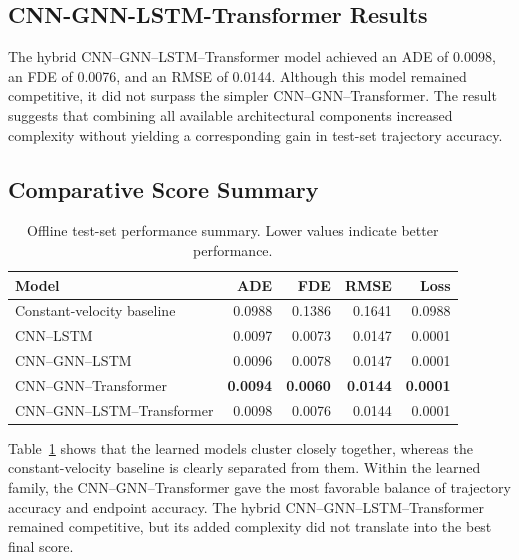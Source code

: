 \subsection{CNN-GNN-LSTM-Transformer Results}

The hybrid CNN--GNN--LSTM--Transformer model achieved an ADE of 0.0098, an FDE of 0.0076, and an RMSE of 0.0144. Although this model remained competitive, it did not surpass the simpler CNN--GNN--Transformer. The result suggests that combining all available architectural components increased complexity without yielding a corresponding gain in test-set trajectory accuracy.

\subsection{Comparative Score Summary}

\begin{table}[tbp]
    \caption{Offline test-set performance summary. Lower values indicate better performance.}
    \label{tab:offline_metric_summary}
    \centering
    \scriptsize
    \setlength{\tabcolsep}{4pt}
    \renewcommand{\arraystretch}{1.12}
    \begin{tabular}{@{}lrrrr@{}}
        \toprule
        \textbf{Model} & \textbf{ADE} & \textbf{FDE} & \textbf{RMSE} & \textbf{Loss} \\
        \midrule
        Constant-velocity baseline & 0.0988 & 0.1386 & 0.1641 & 0.0988 \\
        CNN--LSTM & 0.0097 & 0.0073 & 0.0147 & 0.0001 \\
        CNN--GNN--LSTM & 0.0096 & 0.0078 & 0.0147 & 0.0001 \\
        CNN--GNN--Transformer & \textbf{0.0094} & \textbf{0.0060} & \textbf{0.0144} & \textbf{0.0001} \\
        CNN--GNN--LSTM--Transformer & 0.0098 & 0.0076 & 0.0144 & 0.0001 \\
        \bottomrule
    \end{tabular}
\end{table}

Table~\ref{tab:offline_metric_summary} shows that the learned models cluster closely together, whereas the constant-velocity baseline is clearly separated from them. Within the learned family, the CNN--GNN--Transformer gave the most favorable balance of trajectory accuracy and endpoint accuracy. The hybrid CNN--GNN--LSTM--Transformer remained competitive, but its added complexity did not translate into the best final score.

